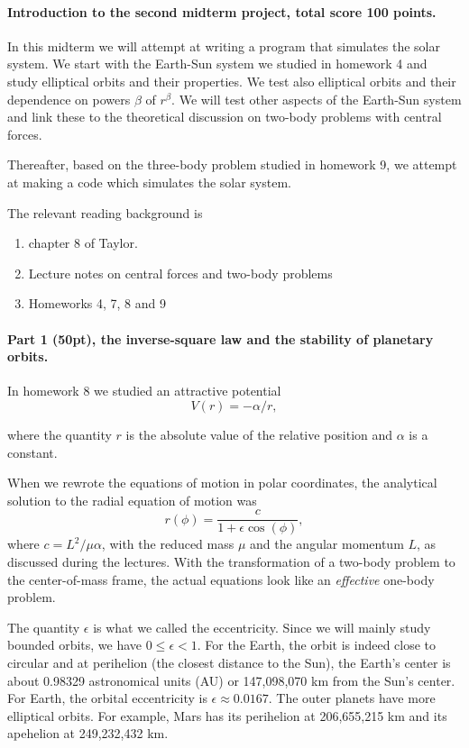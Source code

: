 \documentclass[%
oneside,                 %
final,                   %
10pt]{article}
\begin{document}
\noindent
\paragraph{Introduction to the second midterm project, total score 100 points.}
In this midterm we will attempt at writing a program that simulates
the solar system. We start with the Earth-Sun system we studied in
homework 4 and study elliptical orbits and their properties. We test
also elliptical orbits and their dependence on powers $\beta$ of
$r^{\beta}$. We will test other aspects of the Earth-Sun system and
link these to the theoretical discussion on two-body problems with
central forces. 

Thereafter, based on the three-body problem studied in homework 9, we
attempt at making a code which simulates the solar system.

The relevant reading background is
\begin{enumerate}
\item chapter 8 of  Taylor.

\item Lecture notes on central forces and two-body problems

\item Homeworks 4, 7, 8 and 9
\end{enumerate}

\noindent
\paragraph{Part 1 (50pt), the inverse-square law and the stability of planetary orbits.}
In homework 8 we studied an attractive potential
\[
V(r)=-\alpha/r,
\]

where the quantity $r$ is the absolute value of the relative position and $\alpha$ is a constant.

When we rewrote the equations of motion in polar coordinates, the analytical solution to the radial equation of motion was
\[
r(\phi) = \frac{c}{1+\epsilon\cos{(\phi)}},
\]
where $c=L^2/\mu\alpha$, with
the reduced mass $\mu$ and the angular momentum $L$, as
discussed during the lectures. With the transformation of a two-body
problem to the center-of-mass frame, the actual equations look like an
\emph{effective} one-body problem. 

The quantity $\epsilon$ is what we called the eccentricity. Since we will mainly study bounded orbits,
we have $0 \le \epsilon < 1$.
For the Earth, the orbit is indeed close to circular and at perihelion (the closest distance to the Sun), the Earth's center is about 0.98329 astronomical units (AU) or 147,098,070 km from the Sun's center. For Earth, the orbital eccentricity is $\epsilon\approx 0.0167$. The outer planets have more elliptical orbits. For example, Mars has its perihelion at 206,655,215 km and its apehelion at 249,232,432 km. 
\end{document}
